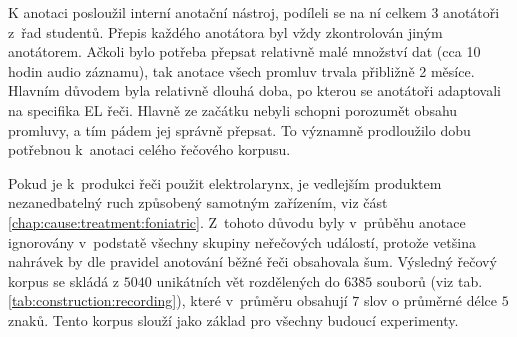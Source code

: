 K anotaci posloužil interní anotační nástroj, podíleli se na ní celkem 3 anotátoři z~řad studentů.
Přepis každého anotátora byl vždy zkontrolován jiným anotátorem.
Ačkoli bylo potřeba přepsat relativně malé množství dat (cca 10 hodin audio záznamu), tak anotace všech promluv trvala přibližně 2 měsíce.
Hlavním důvodem byla relativně dlouhá doba, po kterou se anotátoři adaptovali na specifika EL řeči.
Hlavně ze začátku nebyli schopni porozumět obsahu promluvy, a tím pádem jej správně přepsat.
To významně prodloužilo dobu potřebnou  k~anotaci celého řečového korpusu.

Pokud je  k~produkci řeči použit elektrolarynx, je vedlejším produktem nezanedbatelný ruch způsobený samotným zařízením, viz část \ref{chap:cause:treatment:foniatric}.
Z~tohoto důvodu byly v~průběhu anotace ignorovány v~podstatě všechny skupiny neřečových událostí, protože vetšina nahrávek by dle pravidel anotování běžné řeči obsahovala šum.
Výsledný řečový korpus se skládá z $5040$ unikátních vět rozdělených do $6385$ souborů (viz tab. \ref{tab:construction:recording}), které v~průměru obsahují $7$ slov o průměrné délce $5$ znaků. Tento korpus slouží jako základ pro všechny budoucí experimenty.
